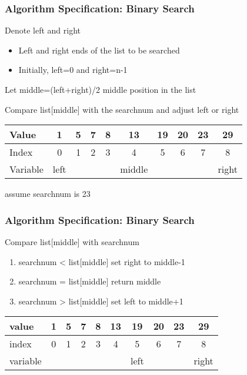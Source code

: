 \documentclass[newPxFont,sthlmFooter,nooffset]{beamer}
\begin{document}
\begin{frame}[t]
  \frametitle{Algorithm Specification: Binary Search}
Denote left and right
\begin{itemize}
\item Left and right ends of the list to be searched
\item Initially, left=0 and right=n-1
\end{itemize}

Let middle=(left+right)/2 middle position in the list

Compare list[middle] with the searchnum and adjust left or right
	\begin{center}
	\begin{tabular}{| l || c | c | c | c | c | c | c | c | c |}
	\hline
	Value & \cellcolor{green}1 & 5 & 7 & 8 & \cellcolor{yellow}13 & 19 & 20 & 23 & \cellcolor{red}29 \\
	\hline
	Index & \cellcolor{green}0 & 1 & 2 & 3 & \cellcolor{yellow}4 & 5 & 6 & 7 & \cellcolor{red}8 \\
	\hline
	Variable & left & & & & middle & & & & right \\
	\hline
	\end{tabular}
	\end{center}
\begin{center}
		\begin{small}
			 assume searchnum is 23
		\end{small}
\end{center}

\end{frame}
\begin{frame}[t]
  \frametitle{Algorithm Specification: Binary Search}
Compare list[middle] with searchnum
\begin{enumerate}
\item searchnum < list[middle] set right to middle-1
\item searchnum = list[middle] return middle 
\item searchnum > list[middle] set left to middle+1
\end{enumerate}
\begin{center}
	\begin{tabular}{| l || c | c | c | c | c | c | c | c | c |}
		\hline
		value & 1 & 5 & 7 & 8 & 13 & \cellcolor{green}19 & 20 & 23 & \cellcolor{red}29 \\
		\hline
		index & 0 & 1 & 2 & 3 & 4 & \cellcolor{green}5 & 6 & 7 & \cellcolor{red}8 \\
		\hline
		variable & & & & & & left & & & right \\
		\hline
	\end{tabular}
\end{center}

\end{frame}
\end{document}
